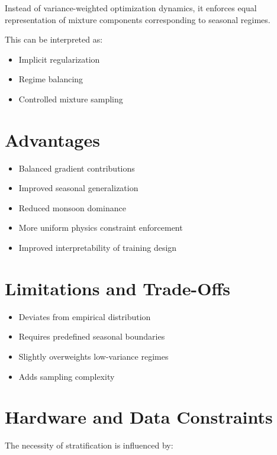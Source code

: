 \documentclass[12pt]{article}
\begin{document}
Instead of variance-weighted optimization dynamics, it enforces equal representation of mixture components corresponding to seasonal regimes.

This can be interpreted as:

\begin{itemize}
    \item Implicit regularization
    \item Regime balancing
    \item Controlled mixture sampling
\end{itemize}

\section{Advantages}

\begin{itemize}
    \item Balanced gradient contributions
    \item Improved seasonal generalization
    \item Reduced monsoon dominance
    \item More uniform physics constraint enforcement
    \item Improved interpretability of training design
\end{itemize}

\section{Limitations and Trade-Offs}

\begin{itemize}
    \item Deviates from empirical distribution
    \item Requires predefined seasonal boundaries
    \item Slightly overweights low-variance regimes
    \item Adds sampling complexity
\end{itemize}

\section{Hardware and Data Constraints}

The necessity of stratification is influenced by:
\end{document}
